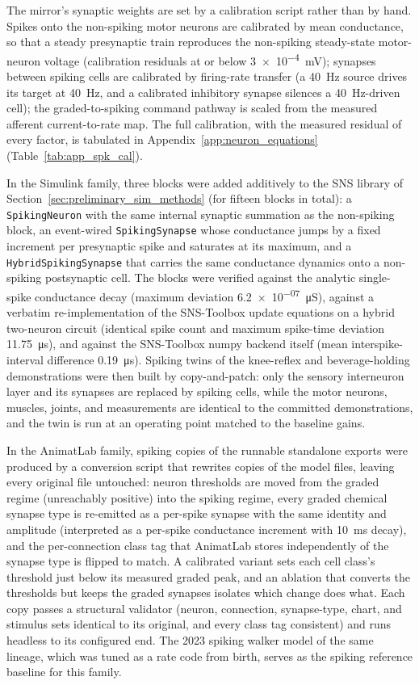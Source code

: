 The mirror's synaptic weights are set by a calibration script rather than by hand. Spikes onto the non-spiking motor neurons are calibrated by mean conductance, so that a steady presynaptic train reproduces the non-spiking steady-state motor-neuron voltage (calibration residuals at or below \qty{3e-4}{\mV}); synapses between spiking cells are calibrated by firing-rate transfer (a \qty{40}{\hertz} source drives its target at \qty{40}{\hertz}, and a calibrated inhibitory synapse silences a \qty{40}{\hertz}-driven cell); the graded-to-spiking command pathway is scaled from the measured afferent current-to-rate map. The full calibration, with the measured residual of every factor, is tabulated in Appendix~\ref{app:neuron_equations} (Table~\ref{tab:app_spk_cal}).

In the Simulink family, three blocks were added additively to the SNS library of Section~\ref{sec:preliminary_sim_methods} (for fifteen blocks in total): a \texttt{SpikingNeuron} with the same internal synaptic summation as the non-spiking block, an event-wired \texttt{SpikingSynapse} whose conductance jumps by a fixed increment per presynaptic spike and saturates at its maximum, and a \texttt{HybridSpikingSynapse} that carries the same conductance dynamics onto a non-spiking postsynaptic cell. The blocks were verified against the analytic single-spike conductance decay (maximum deviation \qty{6.2e-07}{\micro\siemens}), against a verbatim re-implementation of the SNS-Toolbox update equations on a hybrid two-neuron circuit (identical spike count and maximum spike-time deviation \qty{11.75}{\micro\second}), and against the SNS-Toolbox numpy backend itself (mean interspike-interval difference \qty{0.19}{\micro\second}). Spiking twins of the knee-reflex and beverage-holding demonstrations were then built by copy-and-patch: only the sensory interneuron layer and its synapses are replaced by spiking cells, while the motor neurons, muscles, joints, and measurements are identical to the committed demonstrations, and the twin is run at an operating point matched to the baseline gains.

In the AnimatLab family, spiking copies of the runnable standalone exports were produced by a conversion script that rewrites copies of the model files, leaving every original file untouched: neuron thresholds are moved from the graded regime (unreachably positive) into the spiking regime, every graded chemical synapse type is re-emitted as a per-spike synapse with the same identity and amplitude (interpreted as a per-spike conductance increment with \qty{10}{\ms} decay), and the per-connection class tag that AnimatLab stores independently of the synapse type is flipped to match. A calibrated variant sets each cell class's threshold just below its measured graded peak, and an ablation that converts the thresholds but keeps the graded synapses isolates which change does what. Each copy passes a structural validator (neuron, connection, synapse-type, chart, and stimulus sets identical to its original, and every class tag consistent) and runs headless to its configured end. The 2023 spiking walker model of the same lineage, which was tuned as a rate code from birth, serves as the spiking reference baseline for this family.

